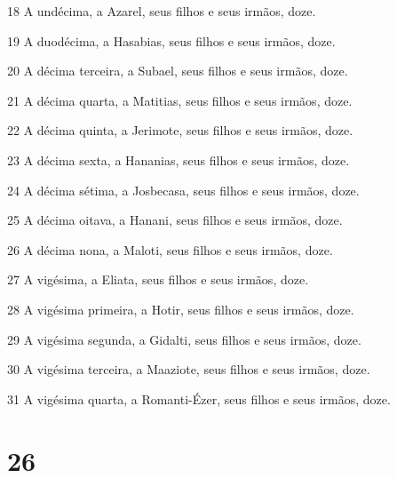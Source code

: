 \par 18 A undécima, a Azarel, seus filhos e seus irmãos, doze.
\par 19 A duodécima, a Hasabias, seus filhos e seus irmãos, doze.
\par 20 A décima terceira, a Subael, seus filhos e seus irmãos, doze.
\par 21 A décima quarta, a Matitias, seus filhos e seus irmãos, doze.
\par 22 A décima quinta, a Jerimote, seus filhos e seus irmãos, doze.
\par 23 A décima sexta, a Hananias, seus filhos e seus irmãos, doze.
\par 24 A décima sétima, a Josbecasa, seus filhos e seus irmãos, doze.
\par 25 A décima oitava, a Hanani, seus filhos e seus irmãos, doze.
\par 26 A décima nona, a Maloti, seus filhos e seus irmãos, doze.
\par 27 A vigésima, a Eliata, seus filhos e seus irmãos, doze.
\par 28 A vigésima primeira, a Hotir, seus filhos e seus irmãos, doze.
\par 29 A vigésima segunda, a Gidalti, seus filhos e seus irmãos, doze.
\par 30 A vigésima terceira, a Maaziote, seus filhos e seus irmãos, doze.
\par 31 A vigésima quarta, a Romanti-Ézer, seus filhos e seus irmãos, doze.

\chapter{26}

